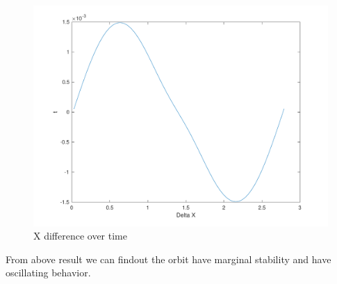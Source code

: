 \begin{figure}[H]
    \centering
    \includegraphics[width=\textwidth]{../Figure/Q2/Q2_3}
    \caption{X difference over time}
\end{figure}

From above result we can findout the orbit have marginal stability and have oscillating behavior. 